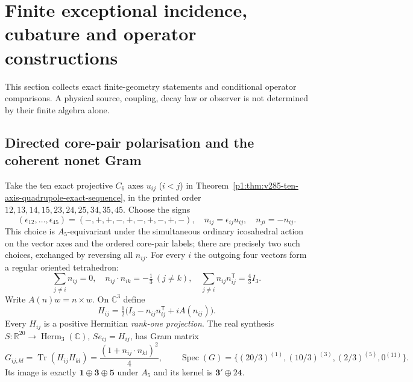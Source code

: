 \documentclass[11pt]{article}
\begin{document}
\section{Finite exceptional incidence, cubature and operator constructions}
This section collects exact finite-geometry statements and conditional
operator comparisons.  A physical source, coupling, decay law or observer
is not determined by their finite algebra alone.


\subsection{Directed core-pair polarisation and the coherent nonet Gram}
\label{p1:sec:cc12-directed-coherent-nonet}

\begin{theorem}
\label{p1:thm:cc12-directed-coherent-gram}
Take the ten exact projective $C_6$ axes $u_{ij}$ ($i<j$) in
Theorem~\ref{p1:thm:v285-ten-axis-quadrupole-exact-sequence}, in the
printed order $12,13,14,15,23,24,25,34,35,45$. Choose the signs
\[
 (\epsilon_{12},\ldots,\epsilon_{45})
 =(-,+,+,-,+,-,+,-,+,-),\quad
 n_{ij}=\epsilon_{ij}u_{ij},\quad n_{ji}=-n_{ij}.
\]
This choice is $A_5$-equivariant under the simultaneous ordinary
icosahedral action on the vector axes and the ordered core-pair labels;
there are precisely two such choices, exchanged by reversing all
$n_{ij}$. For every $i$ the outgoing four vectors form a regular
oriented tetrahedron:
\[
 \sum_{j\ne i}n_{ij}=0,\quad
 n_{ij}\cdot n_{ik}=-\tfrac13\ (j\ne k),\quad
 \sum_{j\ne i}n_{ij}n_{ij}^{\mathsf T}=\tfrac43I_3.
\]
Write $A(n)w=n\times w$. On $\mathbb C^3$ define
\[
 H_{ij}=\tfrac12\big(I_3-n_{ij}n_{ij}^{\mathsf T}+iA(n_{ij})\big).
\]
Every $H_{ij}$ is a positive Hermitian \emph{rank-one projection}.
The real synthesis $S:\mathbb R^{20}\to\operatorname{Herm}_3(\mathbb C)$,
$Se_{ij}=H_{ij}$, has Gram matrix
\[
 G_{ij,kl}=\operatorname{Tr}(H_{ij}H_{kl})
 =\frac{(1+n_{ij}\cdot n_{kl})^2}{4},\qquad
 \boxed{\operatorname{Spec}(G)=
 \{(20/3)^{(1)},(10/3)^{(3)},(2/3)^{(5)},0^{(11)}\}.}
\]
Its image is exactly $\mathbf1\oplus\mathbf3\oplus\mathbf5$
under $A_5$ and its kernel is $\mathbf3'\oplus2\mathbf4$.
\end{theorem}
\end{document}
